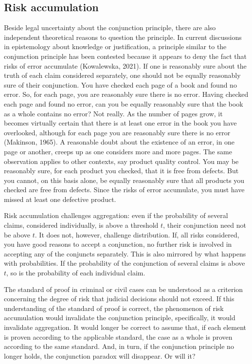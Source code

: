 \documentclass[
  10pt,
  dvipsnames,enabledeprecatedfontcommands]{scrartcl}
\newcommand{\mar}[1]{\todo[color=blue!40]{#1}}
\begin{document}
\hypertarget{risk-accumulation}{%
\subsection{Risk accumulation}\label{risk-accumulation}}

Beside legal uncertainty about the conjunction principle, there are also
independent theoretical reasons to question the principle. In current
discussions in epistemology about knowledge or justification, a
principle similar to the conjunction principle has been contested
because it appears to deny the fact that risks of error accumulate
(Kowalewska, 2021). If one is reasonably sure about the truth of each
claim considered separately, one should not be equally reasonably sure
of their conjunction. You have checked each page of a book and found no
error. So, for each page, you are reasonably sure there is no error.
Having checked each page and found no error, can you be equally
reasonably sure that the book as a whole contains no error? Not really.
As the number of pages grow, it becomes virtually certain that there is
at least one error in the book you have overlooked, although for each
page you are reasonably sure there is no error (Makinson, 1965). A
reasonable doubt about the existence of an error, in one page or
another, creeps up as one considers more and more pages. The same
observation applies to other contexts, say product quality control. You
may be reasonably sure, for each product you checked, that it is free
from defects. But you cannot, on this basis alone, be equally reasonably
sure that all products you checked are free from defects. Since the
risks of error accumulate, you must have missed at least one defective
product.

Risk accumulation challenges aggregation: even if the probability of
several claims, considered individually, is above a threshold \(t\),
their conjunction need not be above \(t\). It does not, however,
challenge distribution. If, all risks considered, you have good reasons
to accept a conjunction, no further risk is involved in accepting any of
the conjuncts separately. This is also mirrored by what happens with
probabilities. If the probability of the conjunction of several claims
is above \(t\), so is the probability of each individual claim.
\mar{R: What's our take on risk accummulation?}

The standard of proof in criminal or civil cases can be understood as a
criterion concerning the degree of risk that judicial decisions should
not exceed. If this understanding of the standard of proof is correct,
the phenomenon of risk accumulation would invalidate the conjunction
principle, specifically, it would invalidate aggregation. It would
longer be correct to assume that, if each element is proven according to
the applicable standard, the case as a whole is proven according to the
same standard. And, in turn, if the conjunction principle no longer
holds, the conjunction paradox will disappear. Or will it?
\end{document}
